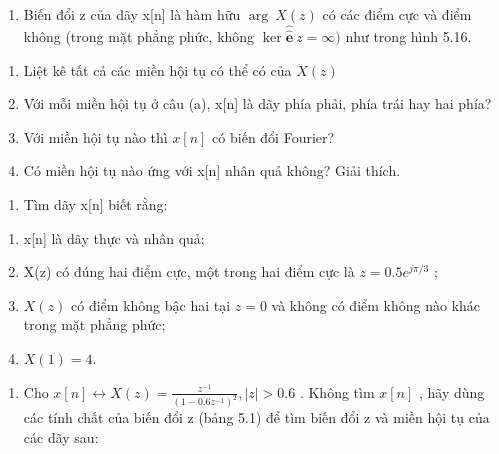 \documentclass[
  10
]{article}
\providecommand{\tightlist}{%
  \setlength{\itemsep}{0pt}\setlength{\parskip}{0pt}}
\begin{document}
\begin{enumerate}
\def\labelenumi{\arabic{enumi}.}
\setcounter{enumi}{2}
\tightlist
\item
  Biến đổi z của dãy x{[}n{]} là hàm hữu \(\arg \ X ( z )\) có các điểm
  cực và điểm không (trong mặt phẳng phức, không
  \(\ker \hat { \hat { \mathbf { e } } } ~ z = \infty )\) như trong hình
  5.16.
\end{enumerate}

\begin{enumerate}
\def\labelenumi{(\alph{enumi})}
\item
  Liệt kê tất cả các miền hội tụ có thể có của \(X ( z )\)
\item
  Với mỗi miền hội tụ ở câu (a), x{[}n{]} là dãy phía phải, phía trái
  hay hai phía?
\item
  Với miền hội tụ nào thì \(x [ n ]\) có biến đổi Fourier?
\item
  Có miền hội tụ nào ứng với x{[}n{]} nhân quả không? Giải thích.
\end{enumerate}

\begin{enumerate}
\def\labelenumi{\arabic{enumi}.}
\setcounter{enumi}{3}
\tightlist
\item
  Tìm dãy x{[}n{]} biết rằng:
\end{enumerate}

\begin{enumerate}
\def\labelenumi{(\roman{enumi})}
\item
  x{[}n{]} là dãy thực và nhân quả;
\item
  X(z) có đúng hai điểm cực, một trong hai điểm cực là
  \(z = 0 . 5 e ^ { j \pi / 3 }\) ;
\item
  \(X ( z )\) có điểm không bậc hai tại \(z = 0\) và không có điểm không
  nào khác trong mặt phẳng phức;
\item
  \(X ( 1 ) = 4 .\)
\end{enumerate}

\begin{enumerate}
\def\labelenumi{\arabic{enumi}.}
\setcounter{enumi}{4}
\tightlist
\item
  Cho
  \(x [ n ] \longleftrightarrow X ( z ) = { \frac { z ^ { - 1 } } { ( 1 - 0 . 6 z ^ { - 1 } ) ^ { 2 } } } , | z | > 0 . 6\)
  . Không tìm \(x [ n ]\) , hãy dùng các tính chất của biến đổi z (bảng
  5.1) để tìm biến đổi z và miền hội tụ của các dãy sau:
\end{enumerate}
\end{document}
